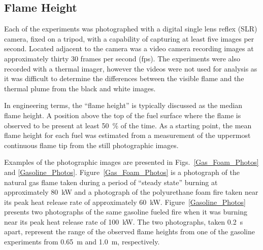 \documentclass[twoside]{uocthesis}
\begin{document}
{\subsection{Flame Height}

Each of the experiments was photographed with a digital single lens reflex (SLR) camera, fixed on a tripod, with a capability of capturing at least five images per second.  Located adjacent to the camera was a video camera recording images at approximately thirty 30 frames per second (fps).  The experiments were also recorded with a thermal imager, however the videos were not used for analysis as it was difficult to determine the differences between the visible flame and the thermal plume from the black and white images.

In engineering terms, the ``flame height'' is typically discussed as the median flame height.  A position above the top of the fuel surface where the flame is observed to be present at least 50~\% of the time.  As a starting point, the mean flame height for each fuel was estimated from a measurement of the uppermost continuous flame tip from the still photographic images.

Examples of the photographic images are presented in Figs.~\ref{Gas_Foam_Photos} and \ref{Gasoline_Photos}.  Figure~\ref{Gas_Foam_Photos} is a photograph of the natural gas flame taken during a period of ``steady state'' burning at approximately 80~kW and a photograph of the polyurethane foam fire taken near its peak heat release rate of approximately 60~kW.  Figure~\ref{Gasoline_Photos} presents two photographs of the same gasoline fueled fire when it was burning near its peak heat release rate of 100~kW.  The two photographs, taken 0.2~s apart, represent the range of the observed flame heights from one of the gasoline experiments from 0.65~m and 1.0~m, respectively.  

}
\end{document}

